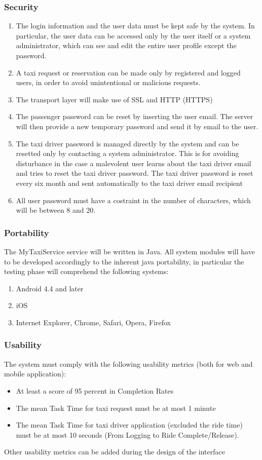 \documentclass[11pt, a4paper,titlepage]{article}
\newcommand{\productname}{MyTaxiService }
\begin{document}
\subsubsection{Security}
 \begin{enumerate}
 	\item The login information and the user data must be kept safe by the system. In particular, the user data can be accessed only by the user itself or a system administrator, which can see and edit the entire user profile except the password.
 	\item A taxi request or reservation can be made only by registered and logged users, in order to avoid unintentional or malicious requests.
 	\item The transport layer will make use of SSL and HTTP (HTTPS) 
 	\item The passenger password can be reset by inserting the user email. The server will then provide a new temporary password and send it by email to the user.
 	\item The taxi driver password is managed directly by the system and can be resetted only by contacting a system administrator. This is for avoiding disturbance in the case a malevolent user learns about the taxi driver email and tries to reset the taxi driver password. 
 	The taxi driver password is reset every six month and sent automatically to the taxi driver email recipient
 	\item All user password must have a costraint in the number of characters, which will be between 8 and 20.
 \end{enumerate}
\subsubsection{Portability}
	The \productname service will be written in Java. All system modules will have to be developed accordingly to the inherent java portability, in particular the testing phase will comprehend the following systems:
	\begin{enumerate}
		\item Android 4.4 and later
		\item iOS
		\item Internet Explorer, Chrome, Safari, Opera, Firefox
	\end{enumerate}
\subsubsection{Usability}
	The system must comply with the following usability metrics (both for web and mobile application):
		\begin{itemize}
		\item At least a score of 95 percent in Completion Rates
		\item The mean Task Time for taxi request must be at most 1 minute
		\item The mean Task Time for taxi driver application (excluded the ride time) must be at most 10 seconds (From Logging to Ride Complete/Release).
	\end{itemize}
	Other usability metrics can be added during the design of the interface
\end{document}
